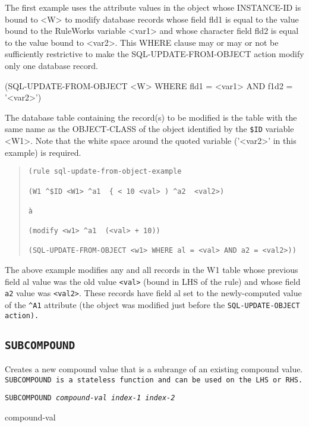 {{The first example uses the attribute values in the object
whose INSTANCE-ID is bound to <W> to modify database records
whose field fld1 is equal to the value bound to the RuleWorks
variable <var1> and whose character field fld2 is equal to
the value bound to <var2>. This WHERE clause may or may or
not be sufficiently restrictive to make the
SQL-UPDATE-FROM-OBJECT action modify only one database
record.



(SQL-UPDATE-FROM-OBJECT <W> WHERE fld1 = <var1> AND f1d2 =
'<var2>')



The database table containing the record(s) to be modified is
the table with the same name as the OBJECT-CLASS of the
object identified by the \verb|$ID| variable <W1>. Note that the
white space around the quoted variable ('<var2>' in this
example) is required.
\begin{quote}
\begin{verbatim}
(rule sql-update-from-object-example

(W1 ^$ID <W1> ^a1  { < 10 <val> ) ^a2  <val2>)

à

(modify <w1> ^a1  (<val> + 10))

(SQL-UPDATE-FROM-OBJECT <w1> WHERE al = <val> AND a2 = <val2>))
\end{verbatim}
\end{quote}

The above example modifies any and all records in the W1 table whose
previous field al value was the old value \verb|<val>| (bound in LHS
of the rule) and whose field \verb|a2| value was \verb|<val2>|. These
records have field al set to the newly-computed value of the
\verb|^A1| attribute (the object was modified just before the
\tt{SQL-UPDATE-OBJECT} action).

\subsection{\tt{SUBCOMPOUND}}

Creates a new compound value that is a subrange of an existing
compound value. \tt{SUBCOMPOUND} is a stateless function and can be
used on the LHS or RHS.

\Format

\tt{SUBCOMPOUND} \it{compound-val} \it{index-1} \it{index-2}

\begin{arguments}
\item[compound-val]


\end{arguments}}}
